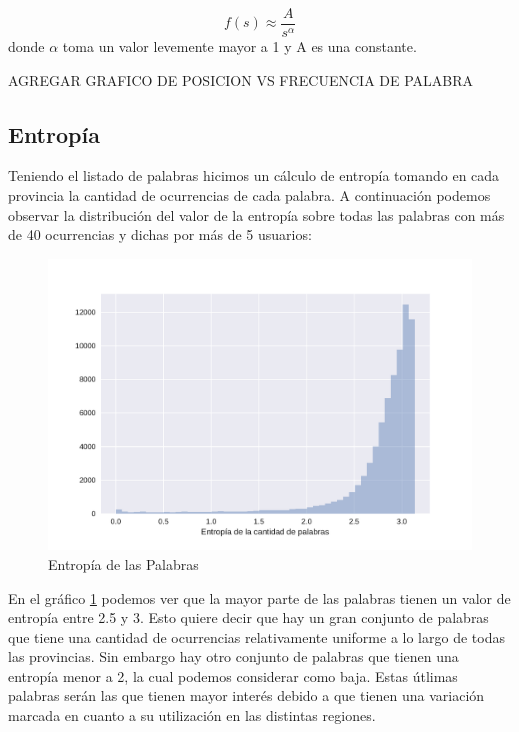 $$f(s) \approx \frac{A}{s^{\alpha}}$$
donde $\alpha$ toma un valor levemente mayor a 1 y A es una constante.

AGREGAR GRAFICO DE POSICION VS FRECUENCIA DE PALABRA




\subsection{Entropía}
Teniendo el listado de palabras hicimos un cálculo de entropía tomando en cada provincia la cantidad de ocurrencias de cada palabra. A continuación podemos observar la distribución del valor de la entropía sobre todas las palabras con más de 40 ocurrencias y dichas por más de 5 usuarios:


\begin{figure}[h]
\centering
\includegraphics[width=1.0\textwidth]{./images/DistribucionEntropia.pdf}
\caption{Entropía de las Palabras} 
\label{fig:entropiaPalabras} 
\end{figure}

En el gráfico \ref{fig:entropiaPalabras} podemos ver que la mayor parte de las palabras tienen un valor de entropía entre 2.5 y 3. Esto quiere decir que hay un gran conjunto de palabras que tiene una cantidad de ocurrencias relativamente uniforme a lo largo de todas las provincias. Sin embargo hay otro conjunto de palabras que tienen una entropía menor a 2, la cual podemos considerar como baja. Estas útlimas palabras serán las que tienen mayor interés debido a que tienen una variación marcada en cuanto a su utilización en las distintas regiones.

